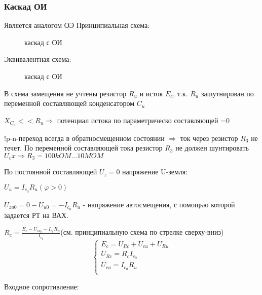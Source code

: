 \subsubsection{Каскад ОИ}

Является аналогом ОЭ
Принципиальная схема:
\begin{center}
	\begin{figure}[h!]
		\caption{каскад с ОИ}
	\end{figure}
\end{center}

Эквивалентная схема:
\begin{center}
	\begin{figure}[h!]
		\caption{каскад с ОИ}
	\end{figure}
\end{center}

В схема замещения не учтены резистор $R_u$ и исток $E_c$, т.к. $R_u$ зашутнирован по переменной составляющей конденсатором $C_u$

$X_{C_u}<<R_u\Rightarrow$ потенциал истока по параметрическо составляющей =0

!p-n-переход всегда в обратносмещенном состоянии $\Rightarrow$ ток через резистор $R_3$ не течет. По переменной составляющей тока резистор $R_3$ не должен шунтировать $U_vx \Rightarrow R_3=100kOM...10MOM$ 

По постоянной составляющей $U_z=0$
напряжение U-земля:

$U_u=I_{c_0}R_u(\varphi>0)$

$U_{zu0}=0-U_{u0}=-I_{c_0}R_u$ - напряжение автосмещения, с помощью которой задается РТ на ВАХ.

$R_c=\frac{E_c-U_{cu_0}-I_{c_0}R_u}{I_{c_0}}$(см. принципиальную схема по стрелке сверху-вниз)
$$
\left\{
 \begin{eqnarray}
E_c=U_{Rc}+U_{cu}+U_{Ru}\\
U_{Rc}=R_cI_{c_0}\\
U_{ru}=I_{c_0}R_u\\
 \end{eqnarray}
\right.
$$
 
 \begin{center}
	\begin{figure}[h!]
	\end{figure}
\end{center}
\pagebreak
Входное сопротивление:

